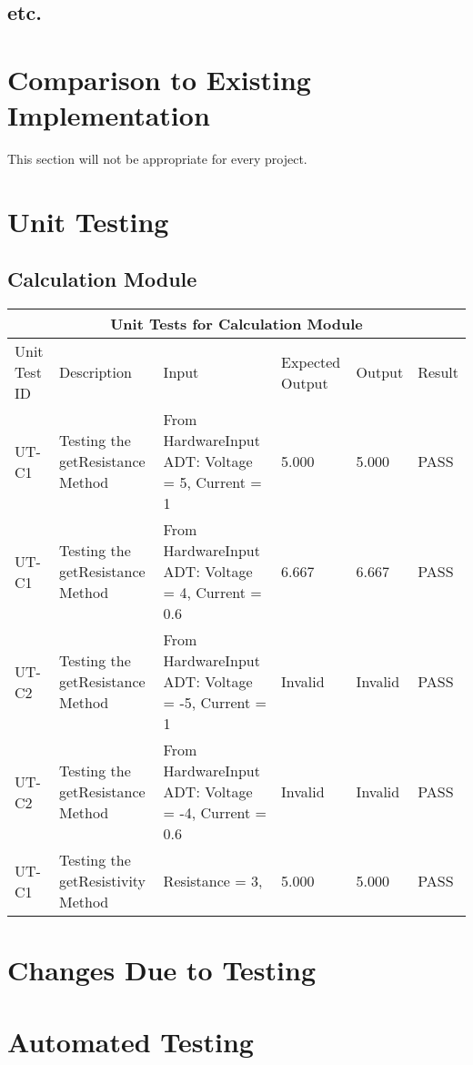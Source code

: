 \documentclass[12pt, titlepage]{article}
\begin{document}
\subsection{etc.}
	
\section{Comparison to Existing Implementation}	

This section will not be appropriate for every project.

\section{Unit Testing}

\subsection{Calculation Module}
\begin{tabular}{ |p{1.5cm}||p{2.5cm}|p{3cm}|p{2cm}|p{2cm}|p{1.5cm}|}
  \hline
  \multicolumn{6}{|c|}{Unit Tests for Calculation Module} \\
  \hline
  Unit Test ID & Description & Input & Expected Output & Output & Result\\
  \hline
  UT-C1   & Testing the getResistance Method  &  From HardwareInput ADT: Voltage = 5, Current = 1 & 5.000 & 5.000 & PASS \\
  \hline
  UT-C1   & Testing the getResistance Method  &  From HardwareInput ADT: Voltage = 4, Current = 0.6 & 6.667 & 6.667 & PASS \\
  \hline
  UT-C2   & Testing the getResistance Method  &  From HardwareInput ADT: Voltage = -5, Current = 1 & Invalid & Invalid & PASS \\
  \hline
  UT-C2   & Testing the getResistance Method  &  From HardwareInput ADT: Voltage = -4, Current = 0.6 & Invalid & Invalid & PASS \\
  \hline
  UT-C1   & Testing the getResistivity Method  &  Resistance = 3,  & 5.000 & 5.000 & PASS \\
  \hline
 \end{tabular}

\section{Changes Due to Testing}

\section{Automated Testing}
		
\end{document}

